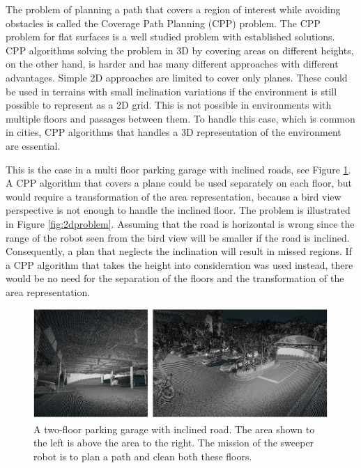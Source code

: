The problem of planning a path that covers a region of interest while avoiding obstacles is called the Coverage Path Planning (CPP) problem. The CPP problem for flat surfaces is a well studied problem with established solutions. CPP algorithms solving the problem in 3D by covering areas on different heights, on the other hand, is harder and has many different approaches with different advantages. Simple 2D approaches are limited to cover only planes. These could be used in terrains with small inclination variations if the environment is still possible to represent as a 2D grid. This is not possible in environments with multiple floors and passages between them.  To handle this case, which is common in cities, CPP algorithms that handles a 3D representation of the environment are essential. \cite{mattiassurvey} 

This is the case in a multi floor parking garage with inclined roads, see Figure \ref{fig:parking_garage}. A CPP algorithm that covers a plane could be used separately on each floor, but would require a transformation of the area representation, because a bird view perspective is not enough to handle the inclined floor. The problem is illustrated in Figure \ref{fig:2dproblem}. Assuming that the road is horizontal is wrong since the range of the robot seen from the bird view will be smaller if the road is inclined. Consequently, a plan that neglects the inclination will result in missed regions. If a CPP algorithm that takes the height into consideration was used instead, there would be no need for the separation of the floors and the transformation of the area representation.

\begin{figure}
    \centering
    \includegraphics{figures/environment.pdf}
    \caption{A two-floor parking garage with inclined road. The area shown to the left is above the area to the right. The mission of the sweeper robot is to plan a path and clean both these floors.}
    \label{fig:parking_garage}
\end{figure}

